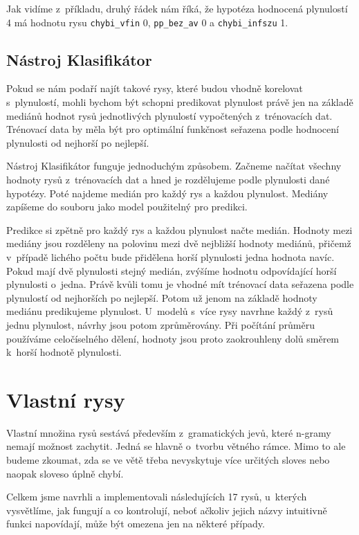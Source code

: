 \documentclass[12pt,a4paper]{report}
\begin{document}
Jak vidíme z~příkladu, druhý řádek nám říká, že hypotéza hodnocená plynulostí 4 má hodnotu rysu \texttt{chybi\_vfin} 0, \texttt{pp\_bez\_av} 0 a \texttt{chybi\_infszu} 1.

\subsection{Nástroj Klasifikátor}
Pokud se nám podaří najít takové rysy, které budou vhodně korelovat s~plynulostí, mohli bychom být schopni predikovat plynulost právě jen na základě mediánů hodnot rysů jednotlivých plynulostí vypočtených z~trénovacích dat. Trénovací data by měla být pro optimální funkčnost seřazena podle hodnocení plynulosti od nejhorší po nejlepší.

Nástroj Klasifikátor funguje jednoduchým způsobem. Začneme načítat všechny hodnoty rysů z~trénovacích dat a hned je rozdělujeme podle plynulosti dané hypotézy. Poté najdeme medián pro každý rys a každou plynulost. Mediány zapíšeme do souboru jako model použitelný pro predikci.

Predikce si zpětně pro každý rys a každou plynulost načte medián. Hodnoty mezi mediány jsou rozděleny na polovinu mezi dvě nejbližší hodnoty mediánů, přičemž v~případě lichého počtu bude přidělena horší plynulosti jedna hodnota navíc. Pokud mají dvě plynulosti stejný medián, zvýšíme hodnotu odpovídající horší plynulosti o~jedna. Právě kvůli tomu je vhodné mít trénovací data seřazena podle plynulostí od nejhorších po nejlepší. Potom už jenom na základě hodnoty mediánu predikujeme plynulost. U~modelů s~více rysy navrhne každý z~rysů jednu plynulost, návrhy jsou potom zprůměrovány. Při počítání průměru používáme celočíselného dělení, hodnoty jsou proto zaokrouhleny dolů směrem k~horší hodnotě plynulosti.



\section{Vlastní rysy}
Vlastní množina rysů sestává především z~gramatických jevů, které n-gramy nemají možnost zachytit. Jedná se hlavně o~tvorbu větného rámce. Mimo to ale budeme zkoumat, zda se ve větě třeba nevyskytuje více určitých sloves nebo naopak sloveso úplně chybí.

Celkem jsme navrhli a implementovali následujících 17 rysů, u~kterých vysvětlíme, jak fungují a co kontrolují, neboť ačkoliv jejich názvy intuitivně funkci napovídají, může být omezena jen na některé případy.
\pagebreak
\end{document}
